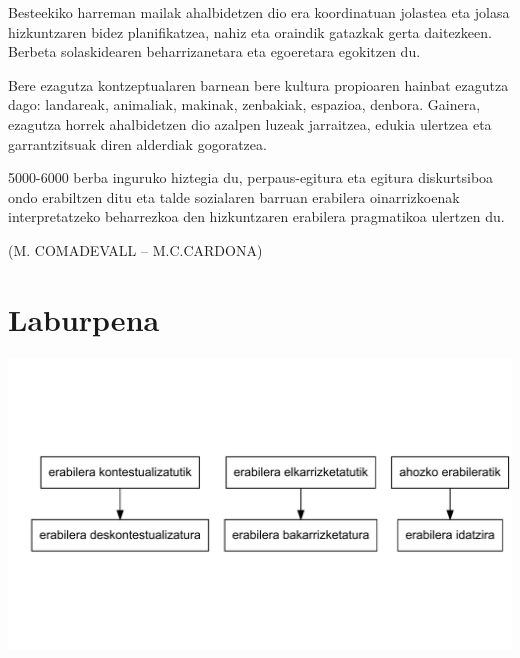 \documentclass[
]{book}
\providecommand{\tightlist}{%
  \setlength{\itemsep}{0pt}\setlength{\parskip}{0pt}}
\begin{document}
\begin{description}
\tightlist
\item[Sozialki]
Besteekiko harreman mailak ahalbidetzen dio era koordinatuan jolastea eta jolasa hizkuntzaren bidez planifikatzea, nahiz eta oraindik gatazkak gerta daitezkeen. Berbeta solaskidearen beharrizanetara eta egoeretara egokitzen du.
\item[Kognitiboki]
Bere ezagutza kontzeptualaren barnean bere kultura propioaren hainbat ezagutza dago: landareak, animaliak, makinak, zenbakiak, espazioa, denbora. Gainera, ezagutza horrek ahalbidetzen dio azalpen luzeak jarraitzea, edukia ulertzea eta garrantzitsuak diren alderdiak gogoratzea.
\item[Linguistikoki]
5000-6000 berba inguruko hiztegia du, perpaus-egitura eta egitura diskurtsiboa ondo erabiltzen ditu eta talde sozialaren barruan erabilera oinarrizkoenak interpretatzeko beharrezkoa den hizkuntzaren erabilera pragmatikoa ulertzen du.
\end{description}

(M. COMADEVALL -- M.C.CARDONA)

\hypertarget{laburpena}{%
\section{Laburpena}\label{laburpena}}

\includegraphics{Hizkuntzaren-Didaktikako-apunteak-V-0-HaurHezkuntza-2020_files/figure-latex/2.2-1.pdf}
\end{document}
